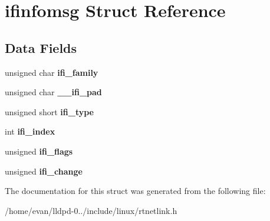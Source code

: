 \section{ifinfomsg \-Struct \-Reference}
\label{structifinfomsg}
\subsection*{\-Data \-Fields}
\begin{DoxyCompactItemize}
\item 
unsigned char {\bfseries ifi\-\_\-family}\label{structifinfomsg_ae90271a1380c7d34d5cdfc2247d4686a}

\item 
unsigned char {\bfseries \-\_\-\-\_\-ifi\-\_\-pad}\label{structifinfomsg_a05d2a3d418eddb90c943dfb23c7708c3}

\item 
unsigned short {\bfseries ifi\-\_\-type}\label{structifinfomsg_a6a1fd4d36a1c70191eb0b0e8e52de2de}

\item 
int {\bfseries ifi\-\_\-index}\label{structifinfomsg_aaff71ae02b1201819e70ba6cf06f43c9}

\item 
unsigned {\bfseries ifi\-\_\-flags}\label{structifinfomsg_a1b3cb95d8cf9ca82f73f5fa1e6c54359}

\item 
unsigned {\bfseries ifi\-\_\-change}\label{structifinfomsg_a865f647d38dbab2edac342d702b785bc}

\end{DoxyCompactItemize}


\-The documentation for this struct was generated from the following file\-:\begin{DoxyCompactItemize}
\item 
/home/evan/lldpd-\/0../include/linux/rtnetlink.\-h\end{DoxyCompactItemize}
